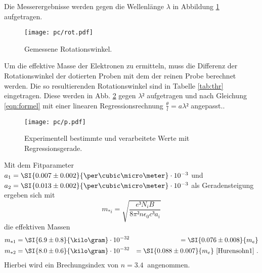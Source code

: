 Die Messerergebnisse werden gegen die Wellenlänge $\lambda$ in Abbildung \ref{fig:rot} aufgetragen.
\begin{figure}
	\centering
	\texttt{[image: pc/rot.pdf]}
	\caption{Gemessene Rotationswinkel.}
	\label{fig:rot}
\end{figure}
Um die effektive Masse der Elektronen zu ermitteln, muss die Differenz der Rotationswinkel der dotierten Proben mit dem der reinen Probe berechnet werden. Die so resultierenden Rotationswinkel sind in Tabelle \ref{tab:thr} eingetragen.
Diese werden in Abb. \ref{fig:p} gegen $\lambda²$ aufgetragen und nach Gleichung \eqref{eqn:formel} mit einer linearen Regressionsrechnung $\frac{\theta}{l} = a\lambda²$ angepasst..
\begin{figure}
	\centering
	\texttt{[image: pc/p.pdf]}
	\caption{Experimentell bestimmte und verarbeitete Werte mit Regressionsgerade.}
	\label{fig:p}
\end{figure}
Mit dem Fitparameter $a_1 = \SI{0.007\pm0.002}{\per\cubic\micro\meter}\cdot 10^{-3}$ und $a_2 = \SI{0.013\pm0.002}{\per\cubic\micro\meter}\cdot10^{-3}$ als Geradensteigung ergeben sich mit
\begin{equation}
	m_{*i} = \sqrt{\frac{e³N_i B}{8\pi² n \epsilon_0 c³ a_i}}
\end{equation}
die effektiven Massen
\begin{align}
	m_{*1} &= \SI{6.9\pm0.8}{\kilo\gram}\cdot10^{-32} &= \SI{0.076\pm0.008}{m_e}\\
	m_{*2} &= \SI{8.0\pm0.6}{\kilo\gram}\cdot10^{-32} &= \SI{0.088\pm0.007}{m_e}\text{ \cite{Hurensohn1} .}
\end{align}
Hierbei wird ein Brechungsindex von $n=\SI{3.4}{}$ \cite{Hurensohn2} angenommen.


